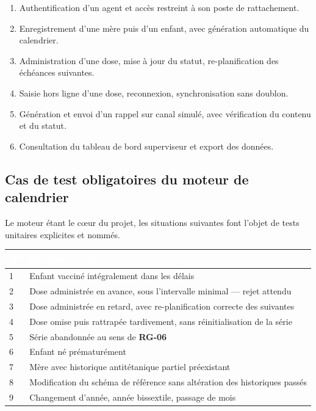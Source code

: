 \documentclass[11pt,a4paper]{article}
\newcommand{\rid}[1]{{\sffamily\bfseries\footnotesize\color{primary}#1}}
\newcommand{\hd}[1]{\textcolor{white}{\sffamily\bfseries\small #1}}
\newcommand{\rowhead}{\rowcolor{primary}}
\begin{document}
\begin{enumerate}
  \item Authentification d'un agent et accès restreint à son poste de rattachement.
  \item Enregistrement d'une mère puis d'un enfant, avec génération automatique du calendrier.
  \item Administration d'une dose, mise à jour du statut, re-planification des échéances suivantes.
  \item Saisie hors ligne d'une dose, reconnexion, synchronisation sans doublon.
  \item Génération et envoi d'un rappel sur canal simulé, avec vérification du contenu et du statut.
  \item Consultation du tableau de bord superviseur et export des données.
\end{enumerate}

\subsection{Cas de test obligatoires du moteur de calendrier}

Le moteur étant le cœur du projet, les situations suivantes font l'objet de tests
unitaires explicites et nommés.

\noindent
\begin{tabularx}{\textwidth}{@{}C{1.3cm} L@{}}
\toprule
\rowhead \hd{N\textsuperscript{o}} & \hd{Situation testée} \\
 & Enfant vacciné intégralement dans les délais \\
2 & Dose administrée en avance, sous l'intervalle minimal — rejet attendu \\
3 & Dose administrée en retard, avec re-planification correcte des suivantes \\
4 & Dose omise puis rattrapée tardivement, sans réinitialisation de la série \\
5 & Série abandonnée au sens de \rid{RG-06} \\
6 & Enfant né prématurément \\
7 & Mère avec historique antitétanique partiel préexistant \\
8 & Modification du schéma de référence sans altération des historiques passés \\
9 & Changement d'année, année bissextile, passage de mois \\
\bottomrule
\end{tabularx}
\end{document}

